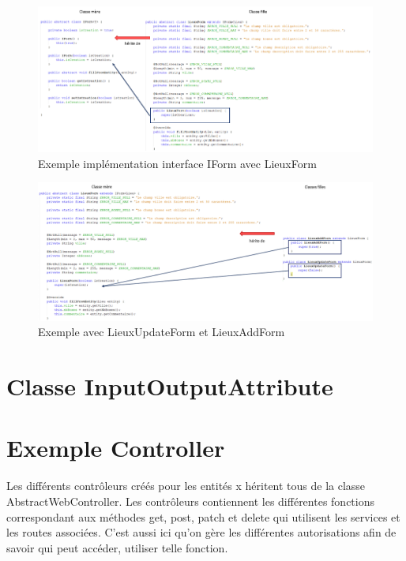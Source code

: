 		\begin{figure}[H]
			\centering\includegraphics[width=1\textwidth, keepaspectratio]{res/IForm.png}
			\caption{Exemple implémentation interface IForm avec LieuxForm}
		\end{figure}

		\begin{figure}[H]
			\centering\includegraphics[width=1\textwidth, keepaspectratio]{res/formClassFilles.png}
			\caption{Exemple avec LieuxUpdateForm et LieuxAddForm}
		\end{figure}

	\section{Classe InputOutputAttribute}


	\section{Exemple Controller}


		Les différents contrôleurs créés pour les entités x héritent tous de la classe AbstractWebController. \newline
		Les contrôleurs contiennent les différentes fonctions correspondant aux méthodes get, post, patch et delete qui utilisent les services et les routes associées. C'est aussi ici qu'on gère les différentes autorisations afin de savoir qui peut accéder, utiliser telle fonction.


